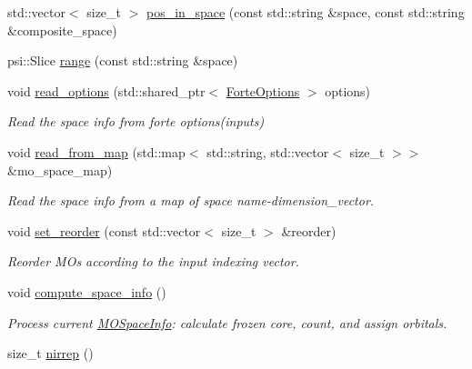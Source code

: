 \begin{DoxyCompactItemize}
\item 
std\+::vector$<$ size\+\_\+t $>$ \mbox{\hyperlink{classforte_1_1_m_o_space_info_abd10f6754af5b1f8dfeb50307c5756d5}{pos\+\_\+in\+\_\+space}} (const std\+::string \&space, const std\+::string \&composite\+\_\+space)
\item 
psi\+::\+Slice \mbox{\hyperlink{classforte_1_1_m_o_space_info_aefa3be2af6a786b5b573f9f3130ed1fa}{range}} (const std\+::string \&space)
\item 
void \mbox{\hyperlink{classforte_1_1_m_o_space_info_a05576541580654229b4dbea3c9f39e24}{read\+\_\+options}} (std\+::shared\+\_\+ptr$<$ \mbox{\hyperlink{classforte_1_1_forte_options}{Forte\+Options}} $>$ options)
\begin{DoxyCompactList}\small\item\em Read the space info from forte options(inputs) \end{DoxyCompactList}\item 
void \mbox{\hyperlink{classforte_1_1_m_o_space_info_ab22c8f0b84fdecdf94c583eb27ca4420}{read\+\_\+from\+\_\+map}} (std\+::map$<$ std\+::string, std\+::vector$<$ size\+\_\+t $>$$>$ \&mo\+\_\+space\+\_\+map)
\begin{DoxyCompactList}\small\item\em Read the space info from a map of space name-\/dimension\+\_\+vector. \end{DoxyCompactList}\item 
void \mbox{\hyperlink{classforte_1_1_m_o_space_info_a937878956cf4d68ab674a37ac69654c5}{set\+\_\+reorder}} (const std\+::vector$<$ size\+\_\+t $>$ \&reorder)
\begin{DoxyCompactList}\small\item\em Reorder M\+Os according to the input indexing vector. \end{DoxyCompactList}\item 
void \mbox{\hyperlink{classforte_1_1_m_o_space_info_aa41897ba003dab2da7e902e6e2198bd1}{compute\+\_\+space\+\_\+info}} ()
\begin{DoxyCompactList}\small\item\em Process current \mbox{\hyperlink{classforte_1_1_m_o_space_info}{M\+O\+Space\+Info}}\+: calculate frozen core, count, and assign orbitals. \end{DoxyCompactList}\item 
size\+\_\+t \mbox{\hyperlink{classforte_1_1_m_o_space_info_a6701bf69495d5fbff58f897bf324ea8b}{nirrep}} ()
\end{DoxyCompactItemize}


